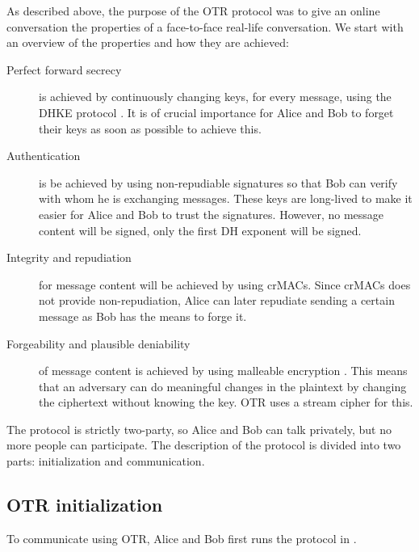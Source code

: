 As described above, the purpose of the \ac{OTR} protocol was to give an online 
conversation the properties of a face-to-face real-life conversation.
We start with an overview of the properties and how they are achieved:
\begin{description}
  \item[Perfect forward secrecy] is achieved by continuously changing keys, for 
    every message, using the \ac{DHKE} protocol \cite{dh}.
    It is of crucial importance for Alice and Bob to forget their keys as soon 
    as possible to achieve this.

  \item[Authentication] is be achieved by using non-repudiable signatures so 
    that Bob can verify with whom he is exchanging messages.
    These keys are long-lived to make it easier for Alice and Bob to trust the 
    signatures.
    However, no message content will be signed, only the first \ac{DH} exponent 
    will be signed.

  \item[Integrity and repudiation] for message content will be achieved by 
    using \acp{crMAC}.
    Since \acp{crMAC} does not provide non-repudiation, Alice can later 
    repudiate sending a certain message as Bob has the means to forge it.

  \item[Forgeability and plausible deniability] of message content is achieved 
    by using malleable encryption \cite{nonmalleable}.
    This means that an adversary can do meaningful changes in the plaintext by 
    changing the ciphertext without knowing the key.
    \ac{OTR} uses a stream cipher for this.
\end{description}

The protocol is strictly two-party, so Alice and Bob can talk privately, but no 
more people can participate.
The description of the protocol is divided into two parts: initialization and 
communication.

\subsection{\acs{OTR} initialization}

To communicate using \ac{OTR}, Alice and Bob first runs the protocol in 
.

